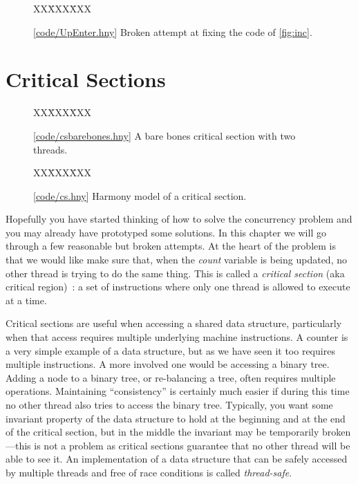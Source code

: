 \documentclass{report}
\newcommand{\harmonysource}[1]{
\begin{tabbing}
XX\=XXX\=XXX\kill
    
\end{tabbing}
}
\newcommand{\harmonylink}[1]{%
[\href{https://harmony.cs.cornell.edu/#1}{\underline{#1}}]%
}
\newenvironment{code}{
\tcolorbox
}{
\endtcolorbox
}
\begin{document}
\begin{figure}
\begin{code}
\harmonysource{UpEnter}
\end{code}
\caption{\harmonylink{code/UpEnter.hny} Broken attempt at fixing the code of \autoref{fig:inc}.}
\label{fig:incenter}
\end{figure}

\chapter{Critical Sections}
\label{ch:critical}

\begin{figure}
\begin{code}
\harmonysource{csbarebones}
\end{code}
\caption{\harmonylink{code/csbarebones.hny} A bare bones critical section with two threads.}
\label{fig:csbarebones}
\end{figure}

\begin{figure}
\begin{code}
\harmonysource{cs}
\end{code}
\caption{\harmonylink{code/cs.hny} Harmony model of a critical section.}
\label{fig:cs}
\end{figure}

Hopefully you have started thinking of how to solve the concurrency
problem and you may already have prototyped some solutions.
In this chapter we will go through a few reasonable but broken attempts.
At the heart of the problem is that we would like make sure that, when
the \textit{count} variable is being updated, no other thread is
trying to do the same thing.  This is called a \emph{critical section}
(aka critical region)~\cite{EWD123}:
a set of instructions where only one thread is allowed to execute at a
time.
%
%

%
%

Critical sections are useful when accessing a shared data
structure, particularly when that access requires multiple underlying
machine instructions.  A counter is a very simple example of
a data structure, but as we have seen it too requires multiple instructions.
A more involved one would be accessing a binary tree.
Adding a node to a binary tree, or re-balancing a tree, often requires
multiple operations.  Maintaining ``consistency'' is certainly much easier
if during this time no other
thread also tries to access the binary tree.
Typically, you want some invariant property of the data structure to hold
at the beginning and at the end of the critical section, but in the middle
the invariant may be temporarily broken---this is not a problem as critical
sections guarantee that no other
thread will be able to see it.
An implementation of a data structure that can be safely accessed by multiple
threads and free of race conditions is called \emph{thread-safe}.
%
%
\end{document}
